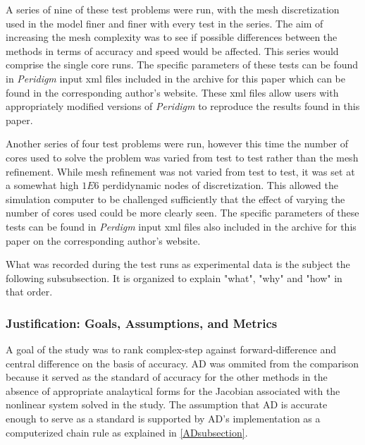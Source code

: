 \documentclass[preprint,12pt]{elsarticle}
\begin{document}
A series of nine of these test problems were run, with the mesh discretization used in the model
finer and finer with every test in the series. The aim of increasing the mesh complexity was to see
if possible differences between the methods in terms of accuracy and speed would be affected. This
series would comprise the single core runs. The specific parameters of these tests can be found in
\emph{Peridigm} input xml files included in the archive for this paper which can be found in the
corresponding author's website. These xml files allow users with appropriately modified versions of
\emph{Peridigm} to reproduce the results found in this paper.

Another series of four test problems were run, however this time the number of cores used to solve
the problem was varied from test to test rather than the mesh refinement. While mesh refinement was
not varied from test to test, it was set at a somewhat high $1E6$ perdidynamic nodes of
discretization. This allowed the simulation computer to be challenged sufficiently that the effect
of varying the number of cores used could be more clearly seen. The specific parameters of these
tests can be found in \emph{Perdigm} input xml files also included in the archive for this paper on
the corresponding author's website.

What was recorded during the test runs as experimental data is the subject the following
subsubsection. It is organized to explain "what", "why" and "how" in that order.

\subsubsection{Justification: Goals, Assumptions, and Metrics} 
\label{JGAM}
A goal of the study was to rank complex-step against forward-difference and central difference on
the basis of accuracy. AD was ommited from the comparison because it served as the standard of
accuracy for the other methods in the absence of appropriate analaytical forms for the Jacobian
associated with the nonlinear system solved in the study. The assumption that AD is accurate
enough to serve as a standard is supported by AD's implementation as a computerized chain rule as
explained in \ref{ADsubsection}.
\end{document}
